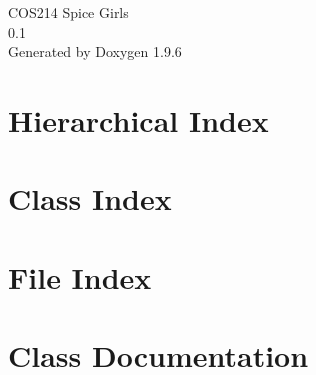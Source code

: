 \documentclass[twoside]{book}
\newcommand{\+}{\discretionary{\mbox{\scriptsize$\hookleftarrow$}}{}{}}
\newcommand{\clearemptydoublepage}{%
    \newpage{\pagestyle{empty}\cleardoublepage}%
  }
\begin{document}
  \raggedbottom
    \hypersetup{pageanchor=false,
                bookmarksnumbered=true,
                pdfencoding=unicode
               }
  \begin{titlepage}
  \vspace*{7cm}
  \begin{center}%
  {\Large COS214 Spice Girls}\\
  [1ex]\large 0.\+1 \\
  \vspace*{1cm}
  {\large Generated by Doxygen 1.9.6}\\
  \end{center}
  \end{titlepage}
  \clearemptydoublepage
  \tableofcontents
  \clearemptydoublepage
  \hypersetup{pageanchor=true}
\chapter{Hierarchical Index}

\chapter{Class Index}

\chapter{File Index}

\chapter{Class Documentation}




































\end{document}
